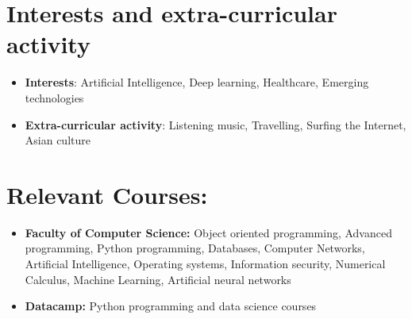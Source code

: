\documentclass[10pt,a4paper,sans]{moderncv}
\begin{document}
	\section{Interests and extra-curricular activity}
		\begin{itemize}
			\vspace{5pt}
			\item \textbf{Interests}: Artificial Intelligence, Deep learning, Healthcare, Emerging technologies
			\vspace{2pt}
			\item \textbf{Extra-curricular activity}: Listening music, Travelling, Surfing the Internet, Asian culture
		\end{itemize}
	
	\section{Relevant Courses:}
		\begin{itemize}
			\vspace{5pt}
			\item \textbf{Faculty of Computer Science: }Object oriented programming, Advanced programming, Python programming, Databases, Computer Networks, 
			Artificial Intelligence, Operating systems, Information security, Numerical Calculus, Machine Learning, Artificial neural networks
			\vspace{5pt}
			\item \textbf{Datacamp: }Python programming and data science courses
		\end{itemize}
	
	\clearpage
\end{document}
